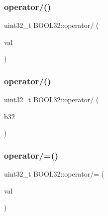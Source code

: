 \hypertarget{struct_b_o_o_l32_a133aba6289e92b27ed583f6e4a480335}{}\label{struct_b_o_o_l32_a133aba6289e92b27ed583f6e4a480335} 
\subsubsection{\texorpdfstring{operator/()}{operator/()}\hspace{0.1cm}{\footnotesize\ttfamily [1/2]}}
{\footnotesize\ttfamily uint32\+\_\+t B\+O\+O\+L32\+::operator/ (\begin{DoxyParamCaption}\item[{const uint32\+\_\+t}]{val }\end{DoxyParamCaption})\hspace{0.3cm}{\ttfamily [inline]}}

\hypertarget{struct_b_o_o_l32_a5cbc400dd5c8d349dd311f6d08dc2a6c}{}\label{struct_b_o_o_l32_a5cbc400dd5c8d349dd311f6d08dc2a6c} 
\subsubsection{\texorpdfstring{operator/()}{operator/()}\hspace{0.1cm}{\footnotesize\ttfamily [2/2]}}
{\footnotesize\ttfamily uint32\+\_\+t B\+O\+O\+L32\+::operator/ (\begin{DoxyParamCaption}\item[{const \hyperlink{struct_b_o_o_l32}{B\+O\+O\+L32}}]{b32 }\end{DoxyParamCaption})\hspace{0.3cm}{\ttfamily [inline]}}

\hypertarget{struct_b_o_o_l32_a45f0a4ea5055b0646b7c236ff8a458e3}{}\label{struct_b_o_o_l32_a45f0a4ea5055b0646b7c236ff8a458e3} 
\subsubsection{\texorpdfstring{operator/=()}{operator/=()}\hspace{0.1cm}{\footnotesize\ttfamily [1/2]}}
{\footnotesize\ttfamily uint32\+\_\+t B\+O\+O\+L32\+::operator/= (\begin{DoxyParamCaption}\item[{const uint32\+\_\+t}]{val }\end{DoxyParamCaption})\hspace{0.3cm}{\ttfamily [inline]}}

